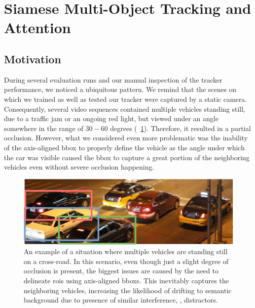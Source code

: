 \section{Siamese Multi-Object Tracking and Attention}
\label{sec:SiamMOTandAttention}

\subsection{Motivation}

During several evaluation runs and our manual inspection of the tracker performance, we noticed a ubiquitous pattern. We remind that the scenes on which we trained as well as tested our tracker were captured by a static camera. Consequently, several video sequences contained multiple vehicles standing still, due to a traffic jam or an ongoing red light, but viewed under an angle somewhere in the range of $30-60$ degrees (\figtext{}~\ref{fig:UADETRACPartialOcclusion}). Therefore, it resulted in a partial occlusion. However, what we considered even more problematic was the inability of the axis-aligned \gls{bbox} to properly define the vehicle as the angle under which the car was visible caused the \gls{bbox} to capture a great portion of the neighboring vehicles even without severe occlusion happening.

\begin{figure}[!t]
    \centerline{\includegraphics[width=0.7\linewidth]{figures/siamese_tracking/uadetrac_partial_occlusion_red_light.pdf}}
    \caption[Partial occlusion in the \uadetrac{} dataset]{An example of a situation where multiple vehicles are standing still on a cross-road. In this scenario, even though just a slight degree of occlusion is present, the biggest issues are caused by the need to delineate \glspl{roi} using axis-aligned \glspl{bbox}. This inevitably captures the neighboring vehicles, increasing the likelihood of drifting to semantic background due to presence of similar interference, \ietext{}, distractors.}
    \label{fig:UADETRACPartialOcclusion}
\end{figure}

